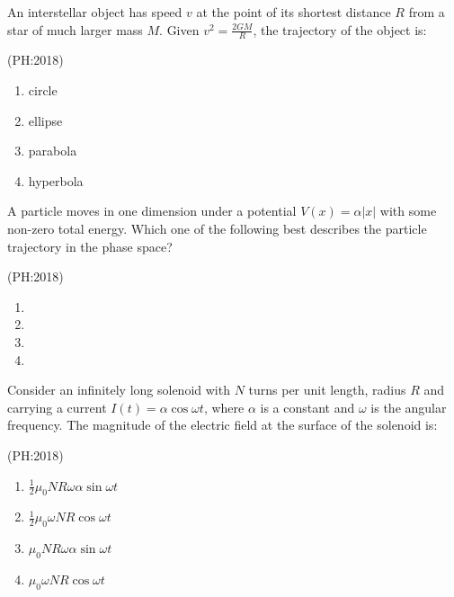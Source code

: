 \iffalse
\title{PH:2018}
\author{AI24BTECH11007}
\section{ph}
\chapter{2018}
\fi

                       
    \item An interstellar object has speed $v$ at the point of its shortest distance $R$ from a star of much larger mass $M$. Given $v^2 = \frac{2GM}{R}$, the trajectory of the object is:

    \hfill{(PH:2018)}
		\begin{multicols}{4}
    \begin{enumerate}
        \item circle
        \item ellipse
        \item parabola
        \item hyperbola
    \end{enumerate}
		\end{multicols}
   

    \item A particle moves in one dimension under a potential $V(x) = \alpha |x|$ with some non-zero total energy. Which one of the following best describes the particle trajectory in the phase space?

    \hfill{(PH:2018)}
		\begin{multicols}{2}
    \begin{enumerate}
	    \item 
        \item 
        \item 
        \item 
    \end{enumerate}
			\end{multicols}
    

    \item Consider an infinitely long solenoid with $N$ turns per unit length, radius $R$ and carrying a current $I(t) = \alpha \cos \omega t$, where $\alpha$ is a constant and $\omega$ is the angular frequency. The magnitude of the electric field at the surface of the solenoid is:

    \hfill{(PH:2018)}
		\begin{multicols}{2}
    \begin{enumerate}
        \item $\frac{1}{2} \mu_0 N R \omega \alpha \sin \omega t$
        \item $\frac{1}{2} \mu_0 \omega N R \cos \omega t$
        \item $\mu_0 N R \omega \alpha \sin \omega t$
        \item $\mu_0 \omega N R \cos \omega t$
    \end{enumerate}
\end{multicols}

